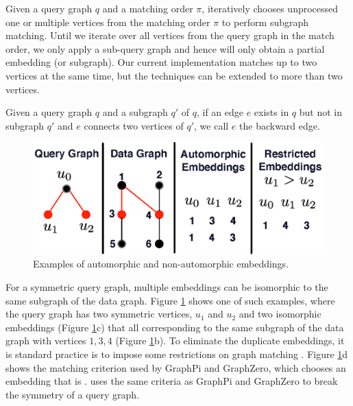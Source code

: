  Given a query graph $q$ and a matching order $\pi$, \SystemName iteratively chooses unprocessed one or
multiple vertices from the matching order $\pi$ to perform subgraph matching. Until we iterate over all vertices from the query graph in
the match order, we only apply a sub-query graph and hence will only obtain a partial embedding (or subgraph). Our current implementation
matches up to two vertices at the same time, but the techniques can be extended to more than two vertices.


 Given a query graph $q$ and a subgraph $q'$ of $q$, if an edge $e$ exists in $q$ but not in subgraph $q'$ and
$e$ connects two vertices of $q'$, we call $e$ the backward edge.

\begin{figure}[t!]
\centering
\includegraphics[width=\columnwidth]{./figure/automorphism.eps}
\caption{Examples of automorphic and non-automorphic embeddings.}	
\label{fig:automo}
\end{figure}

 For a symmetric query graph\FIXME{\cite{}}, multiple embeddings can be isomorphic to the same
subgraph of the data graph. Figure \ref{fig:automo} shows one of such examples, where the query graph has two symmetric vertices, $u_1$ and
$u_2$ and two isomorphic embeddings (Figure \ref{fig:automo}c) that all corresponding to the same subgraph of the data graph with vertices
$1, 3, 4$ (Figure \ref{fig:automo}b). To eliminate the duplicate embeddings, it is standard practice is to impose some restrictions on
graph matching \cite{ mawhirter2019graphzero, shi2020graphpi}. Figure \ref{fig:automo}d shows the matching criterion used by GraphPi and
GraphZero, which chooses an embedding that is . \SystemName uses the same criteria as GraphPi and GraphZero to
break the symmetry of a query graph.

